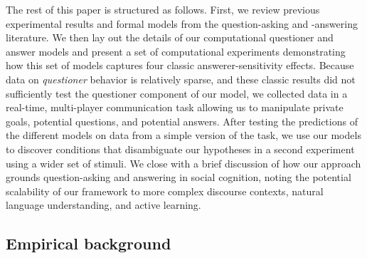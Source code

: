 \documentclass[12pt, floatsintext, jou]{apa6}
\begin{document}
%

The rest of this paper is structured as follows. First, we review previous experimental results and formal models from the question-asking and -answering literature. We then lay out the details of our computational questioner and answer models and present a set of computational experiments demonstrating how this set of models captures four classic answerer-sensitivity effects.
Because data on \emph{questioner} behavior is relatively sparse, and these classic results did not sufficiently test the questioner component of our model, we collected data in a real-time, multi-player communication task allowing us to manipulate private goals, potential questions, and potential answers. After testing the predictions of the different models on data from a simple version of the task, we use our models to discover conditions that disambiguate our hypotheses in a second experiment using a wider set of stimuli.
We close with a brief discussion of how our approach grounds question-asking and answering in social cognition, noting the potential scalability of our framework to more complex discourse contexts, natural language understanding, and active learning.


\subsection{Empirical background}
\end{document}
